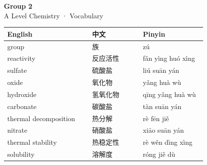 \documentclass[11pt]{article}
\begin{document}
\begin{center}
  {\LARGE\bfseries Group 2}\\[0.35em]
  {\large A Level Chemistry · Vocabulary}
\end{center}
\vspace{0.6em}

\begin{longtable}{@{}p{0.40\linewidth}p{0.24\linewidth}p{0.30\linewidth}@{}}
\toprule
\textbf{English} & \textbf{中文} & \textbf{Pinyin} \\
\midrule
\endhead
\bottomrule
\endlastfoot
group & 族 & zú \\
reactivity & 反应活性 & fǎn yìng huó xìng \\
sulfate & 硫酸盐 & liú suān yán \\
oxide & 氧化物 & yǎng huà wù \\
hydroxide & 氢氧化物 & qīng yǎng huà wù \\
carbonate & 碳酸盐 & tàn suān yán \\
thermal decomposition & 热分解 & rè fēn jiě \\
nitrate & 硝酸盐 & xiāo suān yán \\
thermal stability & 热稳定性 & rè wěn dìng xìng \\
solubility & 溶解度 & róng jiě dù \\
\end{longtable}
\end{document}
